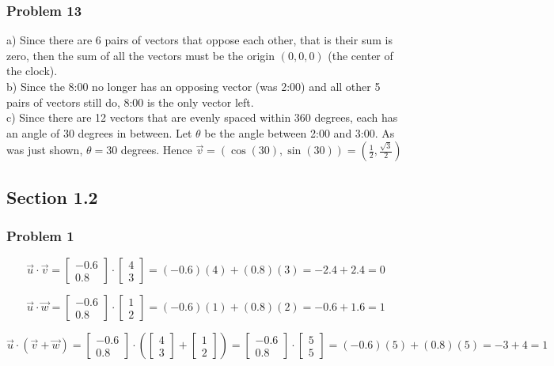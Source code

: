 \documentclass[12pt]{article}
\begin{document}
\subsubsection*{Problem 13} 
a) Since there are 6 pairs of vectors that oppose each other, 
that is their sum is zero, then the sum of all the vectors must be the origin 
$(0, 0, 0)$ (the center of the clock).
~\\

\noindent 
b) Since the 8:00 no longer has an opposing vector (was 2:00) and all other 5 pairs of 
vectors still do, 8:00 is the only vector left. 
~\\

\noindent
c) Since there are 12 vectors that are evenly spaced within 360 degrees, each has an 
angle of 30 degrees in between. Let $\theta$ be the angle between 2:00 and 3:00. As was
just shown, $\theta = 30$ degrees. Hence $\vec{v} = (\cos(30), \sin(30)) =
(\frac{1}{2}, \frac{\sqrt{3}}{2})$

\newpage
\subsection*{Section 1.2}

\subsubsection*{Problem 1}
\[ \vec{u} \cdot \vec{v} = 
\begin{bmatrix} -0.6 \\ 0.8 \end{bmatrix} \cdot 
\begin{bmatrix} 4 \\ 3 \end{bmatrix} = 
(-0.6)(4) + (0.8)(3) = -2.4 + 2.4 = 0 \]

\[ \vec{u} \cdot \vec{w} = 
\begin{bmatrix} -0.6 \\ 0.8 \end{bmatrix} \cdot 
\begin{bmatrix} 1 \\ 2 \end{bmatrix} = 
(-0.6)(1) + (0.8)(2) = -0.6 + 1.6 = 1 \]

\[ \vec{u} \cdot (\vec{v} + \vec{w}) = 
\begin{bmatrix} -0.6 \\ 0.8 \end{bmatrix} \cdot 
(\begin{bmatrix} 4 \\ 3 \end{bmatrix} +
\begin{bmatrix} 1 \\ 2 \end{bmatrix}) = 
\begin{bmatrix} -0.6 \\ 0.8 \end{bmatrix} \cdot 
\begin{bmatrix} 5 \\ 5 \end{bmatrix} =
(-0.6)(5) + (0.8)(5) = -3 + 4 = 1 \]
\end{document}
